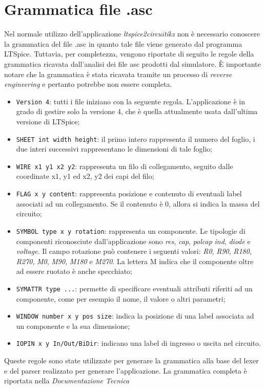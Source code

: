 \clearpage

\section{Grammatica file .asc}
Nel normale utilizzo dell'applicazione \textit{ltspice2circuitikz} non è necessario conoscere la grammatica del file .asc in quanto tale file viene generato dal programma LTSpice. Tuttavia, per completezza, vengono riportate di seguito le regole della grammatica ricavata dall'analisi dei file asc prodotti dal simulatore. È importante notare che la grammatica è stata ricavata tramite un processo di \textit{reverse engineering} e pertanto potrebbe non essere completa.
\begin{itemize}
	\item \texttt{Version 4}: tutti i file iniziano con la seguente regola. L'applicazione è in grado di gestire solo la versione 4, che è quella attualmente usata dall'ultima versione di LTSpice;
	\item \texttt{SHEET int width height}: il primo intero rappresenta il numero del foglio, i due interi successivi rappresentano le dimensioni di tale foglio;
	\item \texttt{WIRE x1 y1 x2 y2}: rappresenta un filo di collegamento, seguito dalle coordinate x1, y1 ed x2, y2 dei capi del filo;
	\item \texttt{FLAG x y content}: rappresenta posizione e contenuto di eventuali label associati ad un collegamento. Se il contenuto è 0, allora si indica la massa del circuito;
	\item \texttt{SYMBOL type x y rotation}: rappresenta un componente. Le tipologie di componenti riconosciute dall'applicazione sono \textit{res}, \textit{cap}, \textit{polcap} \textit{ind}, \textit{diode} e \textit{voltage}. Il campo rotazione può contenere i seguenti valori: \textit{R0}, \textit{R90}, \textit{R180}, \textit{R270}, \textit{M0}, \textit{M90}, \textit{M180} e \textit{M270}. La lettera M indica che il componente oltre ad essere ruotato è anche specchiato;
	\item \texttt{SYMATTR type \textlangle ...\textrangle}: permette di specificare eventuali attributi riferiti ad un componente, come per esempio il nome, il valore o altri parametri;
	\item \texttt{WINDOW number x y pos size}: indica la posizione di una label associata ad un componente e la sua dimensione;
	\item \texttt{IOPIN x y \textlangle In/Out/BiDir\textrangle}: indicano una label di ingresso o uscita nel circuito.
\end{itemize}
Queste regole sono state utilizzate per generare la grammatica alla base del lexer e del parser realizzato per generare l'applicazione. La grammatica completa è riportata nella \textit{Documentazione Tecnica}

